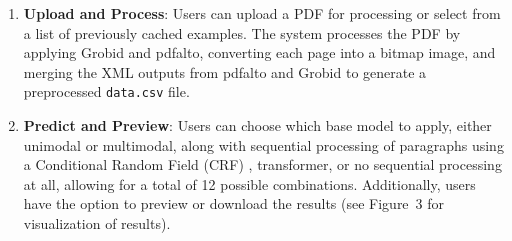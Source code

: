 \documentclass[runningheads]{llncs}
\begin{document}
\begin{enumerate}
    \item \textbf{Upload and Process}: Users can upload a PDF for processing or select from a list of previously 
    cached examples. The system processes the PDF by applying Grobid and pdfalto, converting each page into a bitmap image, 
    and merging the XML outputs from pdfalto and Grobid to generate a preprocessed \texttt{data.csv} file.

    \item \textbf{Predict and Preview}: Users can choose which base model to apply, either unimodal or multimodal, along with 
    sequential processing of paragraphs using a Conditional Random Field (CRF) \cite{crf}, transformer, or no sequential processing at all, 
    allowing for a total of 12 possible combinations. Additionally, users have the option to preview or download the results 
    (see Figure~3 for visualization of results).


\end{enumerate}
\end{document}
